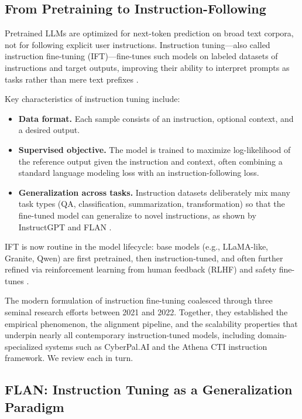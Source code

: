 \documentclass[unnumsec,webpdf,contemporary,large]{oup-authoring-template}
\theoremstyle{thmstyleone}
\theoremstyle{thmstyletwo}
\theoremstyle{thmstylethree}
\begin{document}
\subsection{From Pretraining to Instruction-Following}
\label{sec:ift-pretrain}

Pretrained LLMs are optimized for next-token prediction on broad text corpora, not for following explicit user instructions. Instruction tuning---also called instruction fine-tuning (IFT)---fine-tunes such models on labeled datasets of instructions and target outputs, improving their ability to interpret prompts as tasks rather than mere text prefixes \cite{wei2022flan,ouyang2022instructgpt}.

Key characteristics of instruction tuning include:

\begin{itemize}
  \item \textbf{Data format.} Each sample consists of an instruction, optional context, and a desired output.
  \item \textbf{Supervised objective.} The model is trained to maximize log-likelihood of the reference output given the instruction and context, often combining a standard language modeling loss with an instruction-following loss.
  \item \textbf{Generalization across tasks.} Instruction datasets deliberately mix many task types (QA, classification, summarization, transformation) so that the fine-tuned model can generalize to novel instructions, as shown by InstructGPT and FLAN \cite{wei2022flan,ouyang2022instructgpt}.
\end{itemize}

IFT is now routine in the model lifecycle: base models (e.g., LLaMA-like, Granite, Qwen) are first pretrained, then instruction-tuned, and often further refined via reinforcement learning from human feedback (RLHF) and safety fine-tunes \cite{ouyang2022instructgpt}.

The modern formulation of instruction fine-tuning coalesced through three seminal research efforts between 2021 and 2022. Together, they established the empirical phenomenon, the alignment pipeline, and the scalability properties that underpin nearly all contemporary instruction-tuned models, including domain-specialized systems such as CyberPal.AI and the Athena CTI instruction framework. We review each in turn.

\subsection{FLAN: Instruction Tuning as a Generalization Paradigm}
\label{sec:ift-flan}
\end{document}
